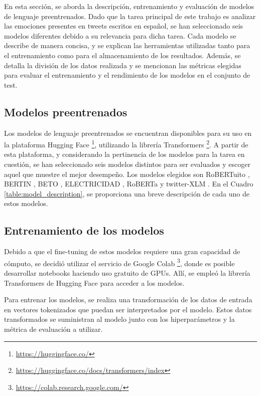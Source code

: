En esta sección, se aborda la descripción, entrenamiento y evaluación de modelos de lenguaje preentrenados. Dado que la tarea principal de este trabajo es analizar las emociones presentes en tweets escritos en español, se han seleccionado seis modelos diferentes debido a su relevancia para dicha tarea. Cada modelo se describe de manera concisa, y se explican las herramientas utilizadas tanto para el entrenamiento como para el almacenamiento de los resultados. Además, se detalla la división de los datos realizada y se mencionan las métricas elegidas para evaluar el entrenamiento y el rendimiento de los modelos en el conjunto de test.

\subsection{Modelos preentrenados}

Los modelos de lenguaje preentrenados se encuentran disponibles para su uso en la plataforma Hugging Face \footnote{\url{https://huggingface.co/}}, utilizando la librería Transformers \footnote{\url{https://huggingface.co/docs/transformers/index}}. A partir de esta plataforma, y considerando la pertinencia de los modelos para la tarea en cuestión, se han seleccionado seis modelos distintos para ser evaluados y escoger aquel que muestre el mejor desempeño. Los modelos elegidos son RoBERTuito \citep{perez-etal-2022-robertuito}, BERTIN \citep{BERTIN}, BETO \cite{CaneteCFP2020}, ELECTRICIDAD \cite{mromero2020electricidad-base-discriminator}, RoBERTa \cite{ROBERTA} y twitter-XLM \cite{barbieri2022xlm}. En el Cuadro \ref{table:model_description}, se proporciona una breve descripción de cada uno de estos modelos.


\scriptsize

\normalsize



\subsection{Entrenamiento de los modelos}


Debido a que el fine-tuning de estos modelos requiere una gran capacidad de cómputo, se decidió utilizar el servicio de Google Colab \footnote{\url{https://colab.research.google.com/}}, donde es posible desarrollar notebooks haciendo uso gratuito de GPUs. Allí, se empleó la librería Transformers de Hugging Face para acceder a los modelos.

Para entrenar los modelos, se realiza una transformación de los datos de entrada en vectores tokenizados que puedan ser interpretados por el modelo. Estos datos transformados se suministran al modelo junto con los hiperparámetros y la métrica de evaluación a utilizar.

